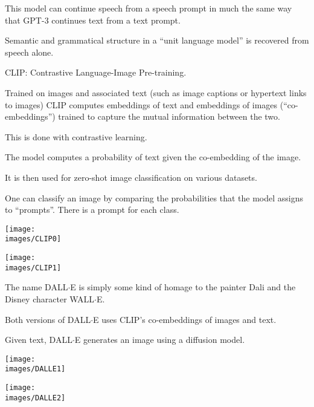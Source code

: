 {{\vfill
This model can continue speech from a speech prompt in much the same way that GPT-3 continues text from a text prompt.

\vfill
Semantic and grammatical structure in a ``unit language model'' is recovered
from speech alone.



CLIP: {\color{red} Contrastive} Language-Image Pre-training.

\vfill
Trained on images and associated text (such as image captions or hypertext links to images) CLIP computes embeddings of text and embeddings of images
(``co-embeddings'') trained to capture the mutual information between the two.

\vfill
This is done with contrastive learning.


The model computes a probability of text given the co-embedding of the image.

\vfill
It is then used for zero-shot image classification on various datasets.

\vfill
One can classify an image by comparing the probabilities that the model assigns to ``prompts''.  There is a prompt for each class.


\centerline{\texttt{[image: \\images/CLIP0]}}


\centerline{\texttt{[image: \\images/CLIP1]}}


The name DALL$\cdot$E is simply some kind of homage to the painter Dali and the Disney character WALL$\cdot$E.

\vfill
Both versions of DALL$\cdot$E uses CLIP's co-embeddings of images and text.

\vfill
Given text, DALL$\cdot$E generates an image using a {\color{red} diffusion model}.


\centerline{\texttt{[image: \\images/DALLE1]}}


\centerline{\texttt{[image: \\images/DALLE2]}}


}}
